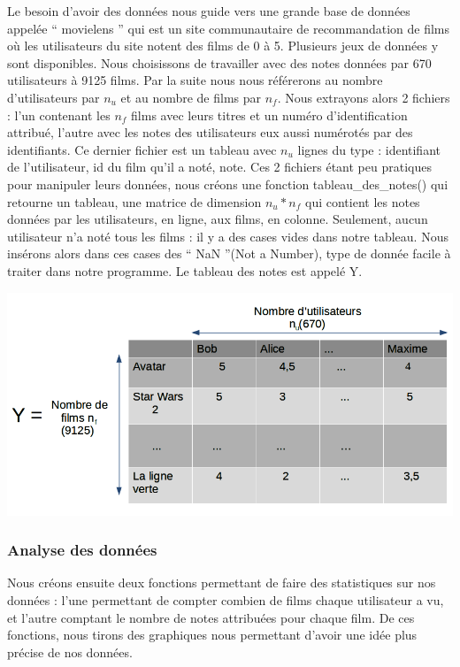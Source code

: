 \documentclass[a4paper,10pt]{article}
\begin{document}
Le besoin d'avoir des données nous guide vers une grande base de données appelée `` movielens '' qui est un site communautaire de recommandation de films où les utilisateurs du site notent des films de 0 à 5.
Plusieurs jeux de données y sont disponibles. 
Nous choisissons de travailler avec des notes données par 670 utilisateurs à 9125 films.
Par la suite nous nous référerons au nombre d'utilisateurs par $n_u$ et au nombre de films par $n_f$.
Nous extrayons alors 2 fichiers : l’un contenant les $n_f$ films avec leurs titres et un numéro d'identification attribué,  
l’autre avec les notes des utilisateurs eux aussi numérotés par des identifiants.
Ce dernier fichier est un tableau avec $n_u$ lignes du type : identifiant de l’utilisateur, id du film qu’il a noté, note. 
Ces 2 fichiers étant peu pratiques pour manipuler leurs données,  
nous créons une fonction tableau\_des\_notes() qui retourne un tableau, une matrice de dimension $n_u * n_f$ qui contient les notes données par les utilisateurs, en ligne, aux films, en colonne. Seulement, aucun utilisateur n'a noté tous les films : il y a des cases vides dans notre tableau. Nous insérons alors dans ces cases des `` NaN ''(Not a Number), type de donnée facile à traiter dans notre programme.
Le tableau des notes est appelé Y.

\includegraphics[scale=0.5]{matriceY.png}

\subsubsection{Analyse des données}

Nous créons ensuite deux fonctions permettant de faire des statistiques sur nos données : l’une permettant de compter combien de films chaque utilisateur a vu, et l’autre comptant le nombre de notes attribuées pour chaque film. De ces fonctions, nous tirons des graphiques nous permettant d'avoir une idée plus précise de nos données.\\
\end{document}

